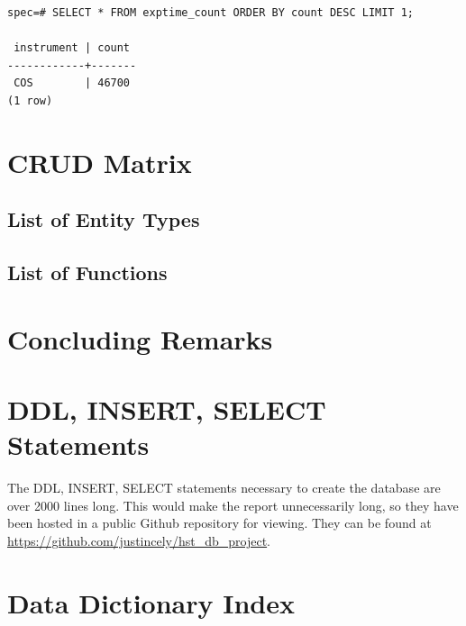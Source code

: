 \documentclass[a4paper,11pt]{article}
\begin{document}
\begin{verbatim}
spec=# SELECT * FROM exptime_count ORDER BY count DESC LIMIT 1;

 instrument | count 
------------+-------
 COS        | 46700
(1 row)
\end{verbatim}


\section{CRUD Matrix}

\subsection{List of Entity Types}
\subsection{List of Functions}

\section{Concluding Remarks}



\pagebreak

\appendix
\section{DDL, INSERT, SELECT Statements}
The DDL, INSERT, SELECT statements necessary to create the database are over 2000 lines long. This would make the report unnecessarily long, so they have been hosted in a public Github repository for viewing. They can be found at \href{https://github.com/justincely/hst\_db\_project}{https://github.com/justincely/hst\_db\_project}.

\section{Data Dictionary Index}
\end{document}
